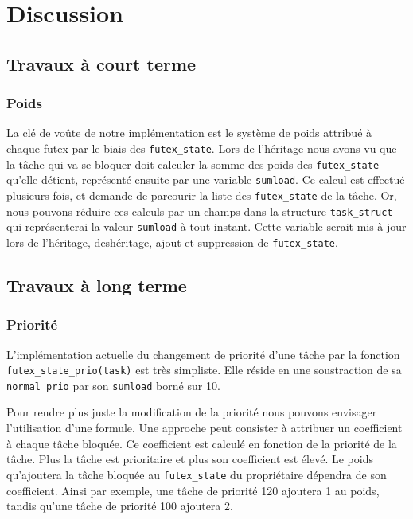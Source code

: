 \section{Discussion}

\subsection{Travaux à court terme}

\subsubsection{Poids}
La clé de voûte de notre implémentation est le système de poids attribué à chaque futex par le biais des
\verb|futex_state|. Lors de l'héritage nous avons vu que la tâche qui va se bloquer doit calculer la somme
des poids des \verb|futex_state| qu'elle détient, représenté ensuite par une variable \verb|sumload|.
Ce calcul est effectué plusieurs fois, et demande de parcourir la liste des \verb|futex_state| de la tâche.
Or, nous pouvons réduire ces calculs par un champs dans la structure \verb|task_struct| qui représenterai
la valeur \verb|sumload| à tout instant. Cette variable serait mis à jour lors de l'héritage, deshéritage,
ajout et suppression de \verb|futex_state|.

\subsection{Travaux à long terme}

\subsubsection{Priorité}
L'implémentation actuelle du changement de priorité d'une tâche par la fonction \verb|futex_state_prio(task)| 
est très simpliste. Elle réside en une soustraction de sa \verb|normal_prio| par son \verb|sumload| 
borné sur 10.

Pour rendre plus juste la modification de la priorité nous pouvons envisager l'utilisation d'une formule.
Une approche peut consister à attribuer un coefficient à chaque tâche bloquée. 
Ce coefficient est calculé en fonction de la priorité de la tâche. 
Plus la tâche est prioritaire et plus son coefficient est élevé.
Le poids qu'ajoutera la tâche bloquée au \verb|futex_state| du propriétaire dépendra de son coefficient.
Ainsi par exemple, une tâche de priorité 120 ajoutera 1 au poids, tandis qu'une tâche de priorité 100
ajoutera 2. 

